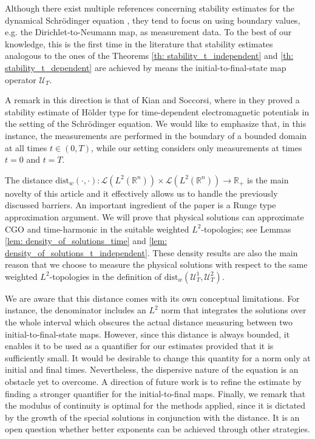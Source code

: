\documentclass[10pt,a4paper]{amsart}
\theoremstyle{remark}
\theoremstyle{definition}
\newcommand{\R}{\mathbb{R}}
\newcommand{\dist}{\mathrm{dist}}
\def\cal{\mathcal}
\begin{document}
 Although there exist multiple references concerning stability estimates for the dynamical Schr\"odinger equation \cite{Baudouin2002,BenAcha2017, Bellassoued2017,Lai2024,Bellassoued2010}, they tend to focus on using boundary values, e.g. the Dirichlet-to-Neumann map, as measurement data. To the best of our knowledge, this is the first time in the literature that stability estimates analogous to the ones of the Theorems \ref{th: stability_t_independent} and \ref{th: stability_t_dependent} are achieved by means the initial-to-final-state map operator $\cal{U}_T$.

A remark in this direction is that of Kian and Soccorsi, where in \cite{Kian2019} they proved a stability estimate of H\"older type for time-dependent electromagnetic potentials in the setting of the Schr\"odinger equation. We would like to emphasize that, in this instance, the measurements are performed in the boundary of a bounded domain at all times $t\in (0,T)$, while our setting considers only measurements at times $t=0$ and $t=T$.





\vspace{0.2cm}

The distance $\dist_w(\cdot, \cdot): \cal{L}(L^2(\R^n))\times\cal{L}(L^2(\R^n)) \to \R_+$ is the main novelty of this article and it effectively allows us to handle the previously discussed barriers. 
%
An important ingredient of the paper is a Runge type approximation argument. We will prove that physical solutions can approximate CGO and time-harmonic in the suitable weighted $L^2$-topologies; see Lemmas \ref{lem: density_of_solutions_time} and \ref{lem: density_of_solutions_t_independent}. These density results are also the main reason that we choose to measure the physical solutions with respect to the same weighted $L^2$-topologies in the definition of $\dist_w(\cal{U}_T^1, \cal{U}_T^2)$. 
%

We are aware that this distance comes with its own conceptual limitations. For instance, the denominator includes an $L^2$ norm that integrates the solutions over the whole interval which obscures the actual distance measuring between two initial-to-final-state maps. However, since this distance is always bounded, it enables it to be used as a quantifier for our estimates provided that it is sufficiently small. 
It would be desirable to change this quantity for a norm only at initial and final times. Nevertheless, the dispersive nature of the equation is an obstacle yet to overcome. A direction of future work is to refine the estimate by finding a stronger quantifier for the initial-to-final maps.
Finally, we remark that the modulus of continuity is optimal for the methods applied, since it is dictated by the growth of the special solutions in conjunction with the distance. It is an open question whether better exponents can be achieved through other strategies.
\end{document}

